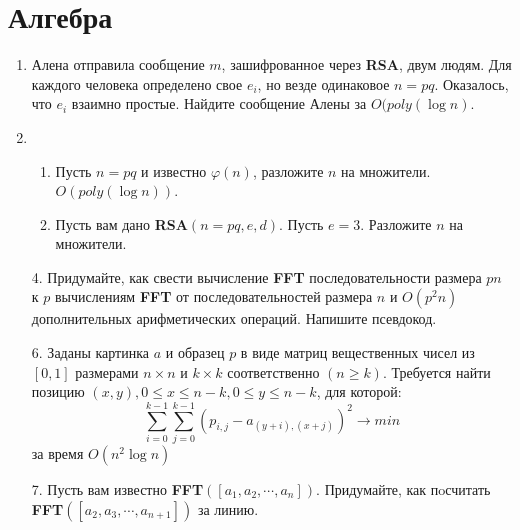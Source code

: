 \section*{Алгебра}
\begin{enumerate}
	\item Алена отправила сообщение $m$, зашифрованное через \textbf{RSA}, двум людям. Для каждого человека 
	определено свое $e_i$, но везде одинаковое $n = pq$. Оказалось, что $e_i$ взаимно простые. Найдите сообщение 
	Алены за $O(poly(\log n)$.
	
	\item 
	\begin{enumerate}
		\item Пусть $n = pq$ и известно $\varphi(n)$, разложите $n$ на множители. $O(poly(\log n))$.
		\item Пусть вам дано \textbf{RSA}$(n = pq, e, d)$. Пусть $e = 3$. Разложите $n$ на множители.
	\end{enumerate}
	
	\item[4.] Придумайте, как свести вычисление \textbf{FFT} последовательности размера $pn$ к $p$ вычислениям 
	\textbf{FFT} от	последовательностей размера $n$ и $O(p^2n)$ дополнительных арифметических операций. Напишите 
	псевдокод.
	
	\item[6.] Заданы картинка $a$ и образец $p$ в виде матриц вещественных чисел из $[0, 1]$ размерами $n \times n$ 
	и $k \times k$ соответственно $(n \geqslant k)$. Требуется найти позицию $(x, y), 0 \leqslant x \leqslant n - 
	k, 0 \leqslant y \leqslant n - k$, для которой:
	\begin{equation*}
		\sum\limits_{i = 0}^{k - 1} \sum\limits_{j = 0}^{k - 1} (p_{i,j} - a_{(y + i), (x + j)})^2 \rightarrow min
	\end{equation*}
	за время $O(n^2\log n)$
	
	\item[7.] Пусть вам известно \textbf{FFT}$([a_1, a_2, \cdots , a_n])$. Придумайте, как пoсчитать 
	\textbf{FFT}$([a_2, a_3, \cdots , a_{n+1}])$ за линию.
	
	
\end{enumerate}



